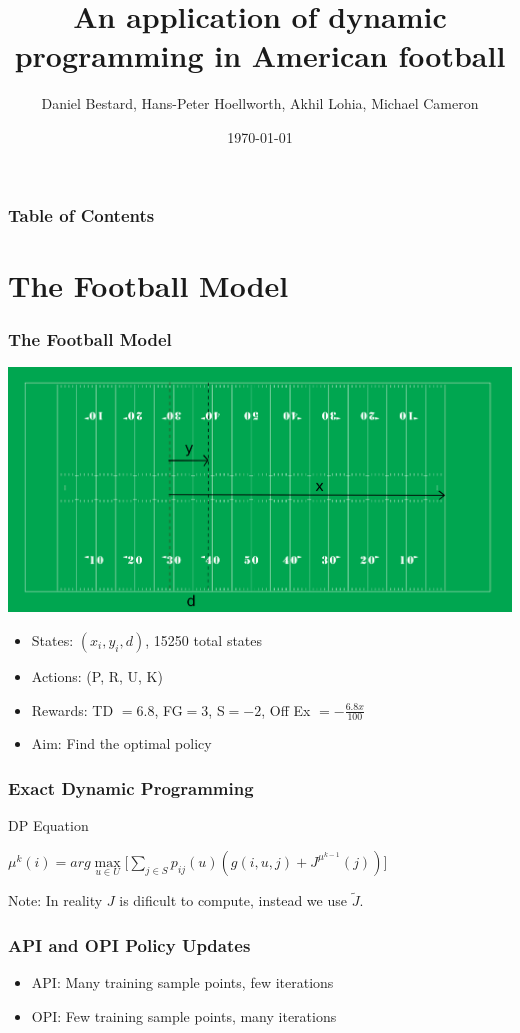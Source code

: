 \documentclass{beamer}
\title[DP in Football]{An application of dynamic programming in American football}
\author[]{Daniel Bestard, Hans-Peter Hoellworth, Akhil Lohia, Michael Cameron}
\institute[BGSE]{Barcelona Graduate School of Economics}
\date{\today}
\begin{document}
\frame{\titlepage}

\begin{frame}
\frametitle{Table of Contents}
\tableofcontents
\end{frame}

\section{The Football Model}
\begin{frame}
\frametitle{The Football Model}

\begin{center}
\includegraphics[scale=0.2]{field}
\end{center}

\begin{itemize}
\item States: $(x_{i}, y_{i}, d)$, 15250 total states 
\item Actions: (P, R, U, K)
\item Rewards: TD $=6.8$, FG$=3$, S$=-2$, Off Ex $= - \frac{6.8 x}{100}$  
\item Aim: Find the optimal policy
\end{itemize}
\end{frame}


\begin{frame}
\frametitle{Exact Dynamic Programming }
\begin{block}{DP Equation}
\begin{center}
$\mu^{k}(i) = arg\max\limits_{u \in U} \Big[ \sum\limits_{j \in S} p_{ij}(u)(g(i,u,j) +  J^{\mu^{k-1}}(j))\Big]$
\end{center}
\end{block}
Note: In reality $J$ is dificult to compute, instead we use $\widetilde{J}$.
\end{frame}

\begin{frame}
\frametitle{API and OPI Policy Updates}
\begin{itemize}
\item API: Many training sample points, few iterations
\item OPI: Few training sample points, many iterations
\end{itemize}
\end{frame}
\end{document}
